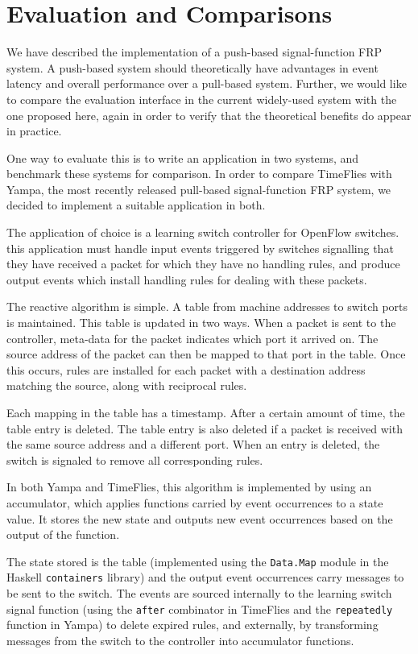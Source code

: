 \chapter{Evaluation and Comparisons}
\label{chapter:Evaluation_and_Comparisons}

We have described the implementation of a push-based signal-function FRP system.
A push-based system should theoretically have advantages in event latency and
overall performance over a pull-based system. Further, we would like to compare
the evaluation interface in the current widely-used system with the one proposed
here, again in order to verify that the theoretical benefits do appear in
practice.

One way to evaluate this is to write an application in two systems, and benchmark
these systems for comparison. In order to compare TimeFlies with Yampa, the most
recently released pull-based signal-function FRP system, we decided to implement
a suitable application in both.

The application of choice is a learning switch controller for OpenFlow switches.
this application must handle input events triggered by switches signalling that
they have received a packet for which they have no handling rules, and produce
output events which install handling rules for dealing with these packets.

The reactive algorithm is simple. A table from machine addresses to switch ports
is maintained. This table is updated in two ways. When a packet is sent to the
controller, meta-data for the packet indicates which port it arrived on. The
source address of the packet can then be mapped to that port in the table.
Once this occurs, rules are installed for each packet with a destination address
matching the source, along with reciprocal rules.

Each mapping in the table has a timestamp. After a certain amount of time, the
table entry is deleted. The table entry is also deleted if a packet is received
with the same source address and a different port. When an entry is deleted,
the switch is signaled to remove all corresponding rules.

In both Yampa and TimeFlies, this algorithm is implemented by using an accumulator,
which applies functions carried by event occurrences to a state value. It stores
the new state and outputs new event occurrences based on the output of the function.

The state stored is the table (implemented using the {\tt Data.Map} module in the
Haskell {\tt containers} library) and the output event occurrences carry messages
to be sent to the switch. The events are sourced internally to the learning
switch signal function (using the {\tt after} combinator in TimeFlies and the {\tt repeatedly}
function in Yampa) to delete expired rules, and externally, by transforming messages
from the switch to the controller into accumulator functions.


